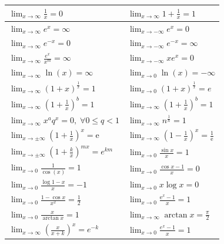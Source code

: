 \bgroup
\def\arraystretch{2}
\begin{center}
	\begin{tabular}{ | l | l | }
		 \hline
                $\lim_{x\to\infty} \frac{1}{x} = 0$ & $\lim_{x\to\infty} 1 + \frac{1}{x} = 1$ \\
		 \hline
                $\lim_{x \to \infty} e^x = \infty$ & $\lim_{x \to - \infty} e^x = 0$ \\
                 \hline
                $\lim_{x \to \infty} e^{-x} = 0$ & $\lim_{x \to - \infty} e^{-x} = \infty$ \\
                 \hline
                $\lim_{x \to \infty} \frac{e^x}{x^m} = \infty$ & $\lim_{x \to - \infty} xe^x = 0$ \\
                 \hline
                $\lim_{x \to \infty} \ln(x) = \infty$ & $\lim_{x \to 0} \ln(x) = - \infty$ \\
                 \hline
                $\lim_{x \to \infty} (1 + x)^{\frac{1}{x}} = 1$ & $\lim_{x \to 0} (1 + x)^{\frac{1}{x}} = e$ \\
                 \hline
	 	$\lim_{x\to\infty} \left(1 + \frac{1}{x}\right)^b = 1$ & $\lim_{x\to\infty} \left(1 + \frac{1}{x}\right)^b = 1$ \\
		 \hline  
	 	$\lim_{x\to\infty} x^aq^x = 0, \; \forall 0 \leq q < 1$ & $\lim_{x\to\infty} n^\frac{1}{n} = 1$ \\
		 \hline
                $\lim_{x\to \pm \infty} \left(1+\frac{1}{x}\right)^x = \mathrm{e}$ & $\lim_{x\to \infty} \left(1-\frac{1}{x}\right)^x = \frac{1}{\mathrm{e}}$ \\
		 \hline
                $\lim_{x \to \pm \infty} \left(1+\frac{k}{x}\right)^{mx} = e^{km}$ & $\lim_{x \to 0} \frac{\sin{x}}{x} = 1$ \\
                 \hline
                $\lim_{x\to 0} \frac{1}{\cos(x)} = 1$ & $\lim_{x\to 0} \frac{\cos{x}-1}{x} = 0$ \\
                 \hline
                $\lim_{x\to 0} \frac{\log{1-x}}{x} = -1$ & $\lim_{x\to 0} x\log{x} = 0$ \\
                 \hline
                $\lim_{x\to 0} \frac{1-\cos{x}}{x^2} = \frac{1}{2}$ & $\lim_{x\to 0} \frac{\mathrm{e}^x-1}{x} = 1$ \\
                 \hline
                $\lim_{x\to 0} \frac{x}{\arctan{x}} = 1$ & $\lim_{x\to\infty} \arctan{x} = \frac{\pi}{2}$ \\
                 \hline
                $\lim_{x \to \infty} \left(\frac{x}{x + k}\right)^x = e^{-k}$ & $\lim_{x \to 0} \frac{e^x - 1}{x} = 1$ \\

\end{tabular}
\end{center}
